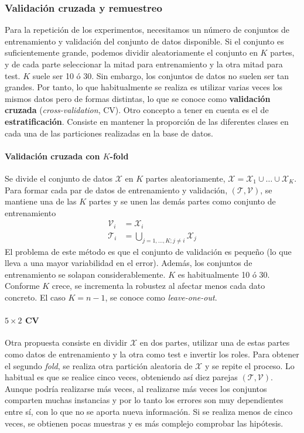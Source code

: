 	
\subsubsection{Validación cruzada y remuestreo}
\label{sssec:CV}
	
	Para la repetición de los experimentos, necesitamos un 
número de conjuntos de entrenamiento y validación del 
conjunto de datos disponible. Si el conjunto es 
suficientemente grande, podemos dividir aleatoriamente el 
conjunto en $K$ partes, y de cada parte seleccionar la mitad 
para entrenamiento y la otra mitad para test. $K$ suele ser 
10 ó 30. Sin embargo, los conjuntos de datos no suelen ser 
tan grandes. Por tanto, lo que habitualmente se realiza es 
utilizar varias veces los mismos datos pero de formas 
distintas, lo que se conoce como \textbf{validación cruzada} 
(\textit{cross-validation}, CV). Otro concepto a tener en 
cuenta es el de \textbf{estratificación}. Consiste en 
mantener la proporción de las diferentes clases en cada una 
de las particiones realizadas en la base de datos. 
	
\paragraph{Validación cruzada con $K$-fold} Se divide el 
conjunto de datos $\mathcal{X}$ en $K$ partes aleatoriamente, 
$\mathcal{X} = \mathcal{X}_1 \cup \dots \cup \mathcal{X}_K$. 
Para formar cada par de datos de entrenamiento y validación, 
$(\mathcal{T}, \mathcal{V})$, se mantiene una de las $K$ 
partes y se unen las demás partes como conjunto de 
entrenamiento
\begin{align*}
	\mathcal{V}_i &= \mathcal{X}_i \\
	\mathcal{T}_i &= \underset{j=1,\dots,K; j\neq i}
							\bigcup \mathcal{X}_j
\end{align*} 
	El problema de este método es que el conjunto de 
validación es pequeño (lo que lleva a una mayor variabilidad 
en el error). Además, los conjuntos de entrenamiento se 
solapan considerablemente. $K$ es habitualmente 10 ó 30. 
Conforme $K$ crece, se incrementa la robustez al afectar 
menos cada dato concreto. El caso $K = n-1$, se conoce como 
\textit{leave-one-out}. 

\paragraph{$5 \times 2$ CV} Otra propuesta consiste en 
dividir $\mathcal{X}$ en dos partes, utilizar una de estas 
partes como datos de entrenamiento y la otra como test e 
invertir los roles. Para obtener el segundo \textit{fold}, se 
realiza otra partición aleatoria de $\mathcal{X}$ y se repite 
el proceso. Lo habitual es que se realice cinco veces, 
obteniendo así diez parejas $(\mathcal{T}, \mathcal{V})$. 
Aunque podría realizarse más veces, al realizarse más veces 
los conjuntos comparten muchas instancias y por lo tanto los 
errores son muy dependientes entre sí, con lo que no se 
aporta nueva información. Si se realiza menos de cinco veces, 
se obtienen pocas muestras y es más complejo comprobar las 
hipótesis.

